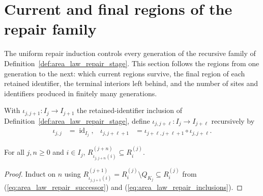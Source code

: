 \section{Current and final regions of the repair family}
\label{sec:area_law_repair_generations}

The uniform repair induction controls every generation of the recursive
family of Definition~\ref{def:area_law_repair_stage}. This section follows the
regions from one generation to the next: which current regions survive, the
final region of each retained identifier, the terminal interiors left behind,
and the number of sites and identifiers produced in finitely many generations.

\begin{definition}
    \label{def:area_law_repair_inclusions}
    \leanok
    With $\iota_{j,j+1}:I_j\to I_{j+1}$ the retained-identifier inclusion of
    Definition~\ref{def:area_law_repair_stage}, define $\iota_{j,j+\ell}:I_j\to I_{j+\ell}$ recursively by
    \begin{align}
        \iota_{j,j} & =\operatorname{id}_{I_j},
                    & \iota_{j,j+\ell+1}
                    & =\iota_{j+\ell,j+\ell+1}\circ\iota_{j,j+\ell}.
        \label{eq:area_law_repair_inclusions}
    \end{align}
\end{definition}

\begin{lemma}
    \label{thm:area_law_repair_current_inclusion_subset}
    \leanok
    For all $j,n\ge0$ and $i\in I_j$, $R_{\iota_{j,j+n}(i)}^{(j+n)}\subseteq R_i^{(j)}$.
\end{lemma}

\begin{proof}\leanok
    Induct on $n$ using $R_{\iota_{j,j+1}(i)}^{(j+1)}=R_i^{(j)}\setminus Q_{K_j}\subseteq R_i^{(j)}$
    from (\ref{eq:area_law_repair_successor}) and (\ref{eq:area_law_repair_inclusions}).
\end{proof}

